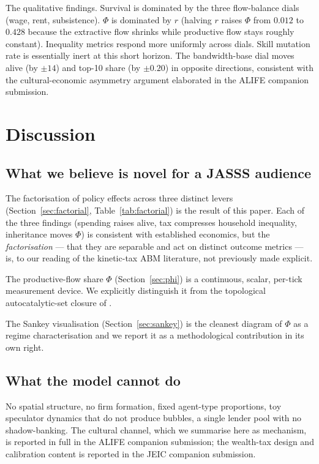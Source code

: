 \documentclass[11pt]{article}
\begin{document}
The qualitative findings.  Survival is dominated by the three
flow-balance dials (wage, rent, subsistence).  $\Phi$ is dominated
by $r$ (halving $r$ raises $\Phi$ from $0.012$ to $0.428$ because
the extractive flow shrinks while productive flow stays roughly
constant).  Inequality metrics respond more uniformly across
dials.  Skill mutation rate is essentially inert at this short
horizon.  The bandwidth-base dial moves alive (by $\pm 14$) and
top-10 share (by $\pm 0.20$) in opposite directions, consistent
with the cultural-economic asymmetry argument elaborated in the
ALIFE companion submission.

\section{Discussion}

\subsection{What we believe is novel for a JASSS audience}

The factorisation of policy effects across three distinct levers
(Section~\ref{sec:factorial}, Table~\ref{tab:factorial}) is the
result of this paper.  Each of the three findings (spending raises
alive, tax compresses household inequality, inheritance moves $\Phi$)
is consistent with established economics, but the
\emph{factorisation} --- that they are separable and act on
distinct outcome metrics --- is, to our reading of the kinetic-tax
ABM literature, not previously made explicit.

The productive-flow share $\Phi$ (Section~\ref{sec:phi}) is a
continuous, scalar, per-tick measurement device.  We explicitly
distinguish it from the topological autocatalytic-set closure of
\citet{hordijk2004detecting}.

The Sankey visualisation (Section~\ref{sec:sankey}) is the cleanest
diagram of $\Phi$ as a regime characterisation and we report it as
a methodological contribution in its own right.

\subsection{What the model cannot do}

No spatial structure, no firm formation, fixed agent-type
proportions, toy speculator dynamics that do not produce bubbles, a
single lender pool with no shadow-banking.  The cultural channel,
which we summarise here as mechanism, is reported in full in the
ALIFE companion submission; the wealth-tax design and calibration
content is reported in the JEIC companion submission.
\end{document}
